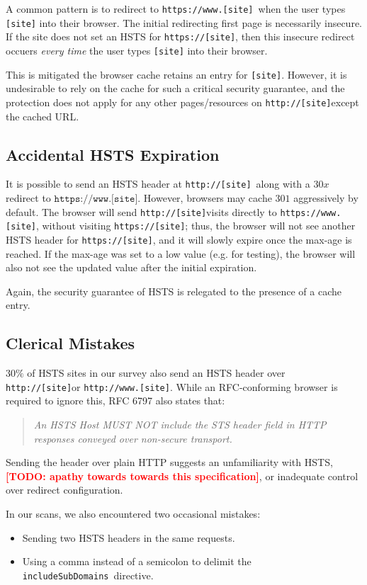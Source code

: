 \documentclass[conference]{./IEEEtran}
\newcommand{\todo}[1]{\textcolor{red}{\textbf{[TODO: #1]}}}
\newcommand{\site}[1]{\texttt{#1}}
\newcommand{\code}[1]{\texttt{#1}}
\newcommand{\iSD}{{\code{includeSubDomains}}}
\newcommand{\genericsite}{[site]}
\newcommand{\h}{{\site{http://\genericsite}}}
\newcommand{\s}{{\site{https://\genericsite}}}
\newcommand{\hw}{{\site{http://www.\genericsite}}}
\newcommand{\sw}{{\site{https://www.\genericsite}}}
\theoremstyle{plain}
\begin{document}
A common pattern is to redirect to \sw~when the user types \site{\genericsite} into their browser. The initial redirecting first page is necessarily insecure. If the site does not set an HSTS for \s, then this insecure redirect occuers \emph{every time} the user types \site{\genericsite} into their browser.

This is mitigated the browser cache retains an entry for \site{\genericsite}. However, it is undesirable to rely on the cache for such a critical security guarantee, and the protection does not apply for any other pages/resources on \h except the cached URL.

\subsection{Accidental HSTS Expiration}

It is possible to send an HSTS header at \h~along with a $30x$ redirect to $\sw$. However, browsers may cache $301$ aggressively by default. The browser will send \h visits directly to \sw, without visiting \s; thus, the browser will not see another HSTS header for \s, and it will slowly expire once the max-age is reached. If the max-age was set to a low value (e.g. for testing), the browser will also not see the updated value after the initial expiration.

Again, the security guarantee of HSTS is relegated to the presence of a cache entry.

\subsection{Clerical Mistakes}

$30\%$ of HSTS sites in our survey also send an HSTS header over \h or \hw. While an RFC-conforming browser is required to ignore this, RFC 6797\cite{rfc} also states that:

\begin{quotation}\it
An HSTS Host MUST NOT include the STS header field in HTTP responses conveyed over non-secure transport.
\end{quotation}

Sending the header over plain HTTP suggests an unfamiliarity with HSTS, \todo{apathy towards towards this specification}, or inadequate control over redirect configuration.

In our scans, we also encountered two occasional mistakes:

\begin{itemize}
\item Sending two HSTS headers in the same requests.
\item Using a comma instead of a semicolon to delimit the \iSD~directive.
\end{itemize}
\end{document}
